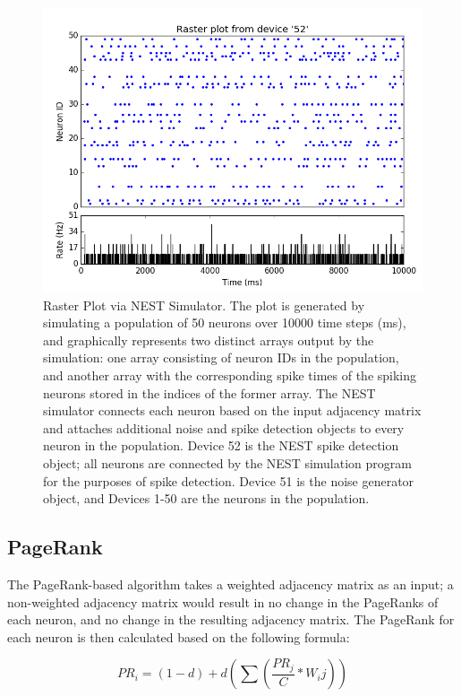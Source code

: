 \documentclass[11pt]{article}
\begin{document}
\begin{figure}[H]
\centering
	\includegraphics[scale=0.5]{./Figures/figure_1.png} 
	\caption{Raster Plot via NEST Simulator. The plot is generated by simulating a population of 50 neurons over 10000 time steps (ms), and graphically represents two distinct arrays output by the simulation: one array consisting of neuron IDs in the population, and another array with the corresponding spike times of the spiking neurons stored in the indices of the former array. The NEST simulator connects each neuron based on the input adjacency matrix and attaches additional noise and spike detection objects to every neuron in the population. Device 52 is the NEST spike detection object; all neurons are connected by the NEST simulation program for the purposes of spike detection. Device 51 is the noise generator object, and Devices 1-50 are the neurons in the population. }
\end{figure}

\subsection{PageRank}
The PageRank-based algorithm takes a weighted adjacency matrix as an input; a non-weighted adjacency matrix would result in no change in the PageRanks of each neuron, and no change in the resulting adjacency matrix. The PageRank for each neuron is then calculated based on the following formula:

$$PR_i = (1-d)+d(\sum(\frac{PR_j}{C} * W_ij))$$
\end{document}
